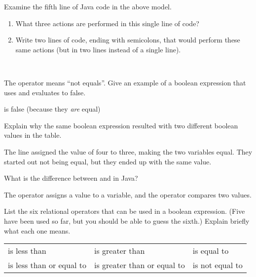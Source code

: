 \Q Examine the fifth line of Java code in the above model.

\begin{enumerate}

\item What three actions are performed in this single line of code?

\item Write two lines of code, ending with semicolons, that would perform these same actions (but in two lines instead of a single line).

 \\

\end{enumerate}


\Q The \java{!=} operator means ``not equals''.
Give an example of a boolean expression that uses \java{!=} and evaluates to false.

\begin{answer}[3em]
 is false (because they \emph{are} equal)
\end{answer}


\Q Explain why the same boolean expression  resulted with two different boolean values in the table.

\begin{answer}
The line  assigned the value of four to three, making the two variables equal.
They started out not being equal, but they ended up with the same value.
\end{answer}


\Q What is the difference between \java{=} and \java{==} in Java?

\begin{answer}
The \java{=} operator assigns a value to a variable, and the \java{==} operator compares two values.
\end{answer}


\Q List the six relational operators that can be used in a boolean expression.
(Five have been used so far, but you should be able to guess the sixth.)
Explain briefly what each one means.

\begin{answer}
\begin{tabular}{lll}
\java{<} is less than              & \java{>} is greater than              & \java{==} is equal to     \\
\java{<=} is less than or equal to & \java{>=} is greater than or equal to & \java{!=} is not equal to \\
\end{tabular}
\end{answer}
